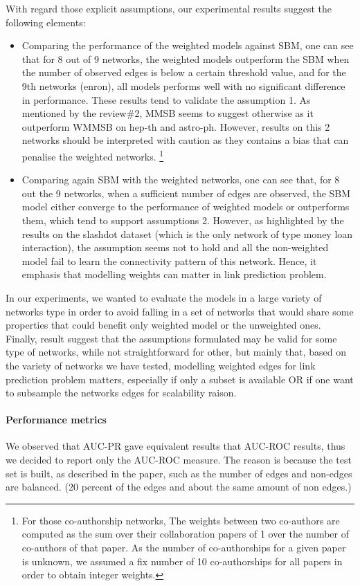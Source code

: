 \documentclass{article}
\begin{document}
With regard those explicit assumptions, our experimental results suggest the following elements:
\begin{itemize}
\item Comparing the performance of the weighted models against SBM, one can see that for 8 out of 9 networks, the weighted models outperform the SBM when the number of observed edges is below a certain threshold value, and for the 9th networks (enron), all models performs well with no significant difference in performance. These results tend to validate the assumption 1. As mentioned by the review\#2, MMSB seems to suggest otherwise as it outperform WMMSB on hep-th and astro-ph. However, results on this 2 networks should be interpreted with caution as they contains a bias that can penalise the weighted networks. \footnote{For those co-authorship networks, The weights between two co-authors are computed as the sum over their collaboration papers of 1 over the number of co-authors of that paper. As the number of co-authorships for a given paper is unknown, we assumed a fix number of 10 co-authorships for all papers in order to obtain integer weights.}
\item Comparing again SBM with the weighted networks, one can see that, for 8 out the 9 networks, when a sufficient number of edges are observed, the SBM model either converge to the performance of weighted models or outperforms them, which tend to support assumptions 2. However, as highlighted by the results on the slashdot dataset (which is the only network of type money loan interaction), the assumption seems not to hold and all the non-weighted model fail to learn the connectivity pattern of this network. Hence, it emphasis that modelling weights can matter in link prediction problem.
\end{itemize}

In our experiments, we wanted to evaluate the models in a large variety of networks type in order to avoid falling in a set of networks that would share some properties that could benefit only weighted model or the unweighted ones. Finally, result suggest that the assumptions formulated may be valid for some type of networks, while not straightforward for other, but mainly that, based on the variety of networks we have tested, modelling weighted edges for link prediction problem matters, especially if only a subset is available OR if one want to subsample the networks edges for scalability raison.


\paragraph{Performance metrics}  We observed that AUC-PR gave equivalent results that AUC-ROC results, thus we decided to report only the AUC-ROC measure. The reason is because the test set is built, as described in the paper, such as the number of edges and non-edges are balanced. (20 percent of the edges and about the same amount of non edges.)
\end{document}
